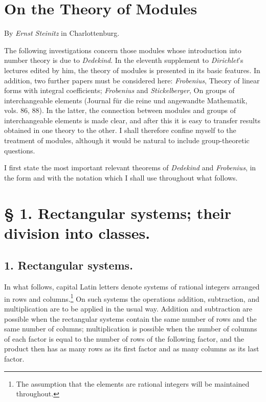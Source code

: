 \documentclass[11pt,a4paper]{article}
\begin{document}
\section*{On the Theory of Modules}
\begin{center}
By \emph{Ernst Steinitz} in Charlottenburg.
\end{center}

The following investigations concern those modules whose introduction into number theory is due to \emph{Dedekind}. In the eleventh supplement to \emph{Dirichlet}'s lectures edited by him, the theory of modules is presented in its basic features. In addition, two further papers must be considered here: \emph{Frobenius}, Theory of linear forms with integral coefficients; \emph{Frobenius} and \emph{Stickelberger}, On groups of interchangeable elements (Journal für die reine und angewandte Mathematik, vols. 86, 88). In the latter, the connection between modules and groups of interchangeable elements is made clear, and after this it is easy to transfer results obtained in one theory to the other. I shall therefore confine myself to the treatment of modules, although it would be natural to include group-theoretic questions.

I first state the most important relevant theorems of \emph{Dedekind} and \emph{Frobenius}, in the form and with the notation which I shall use throughout what follows.

\section*{§ 1. Rectangular systems; their division into classes.}

\subsection*{1. Rectangular systems.}

In what follows, capital Latin letters denote systems of rational integers arranged in rows and columns.\footnote{The assumption that the elements are rational integers will be maintained throughout.} On such systems the operations addition, subtraction, and multiplication are to be applied in the usual way. Addition and subtraction are possible when the rectangular systems contain the same number of rows and the same number of columns; multiplication is possible when the number of columns of each factor is equal to the number of rows of the following factor, and the product then has as many rows as its first factor and as many columns as its last factor.
\end{document}
